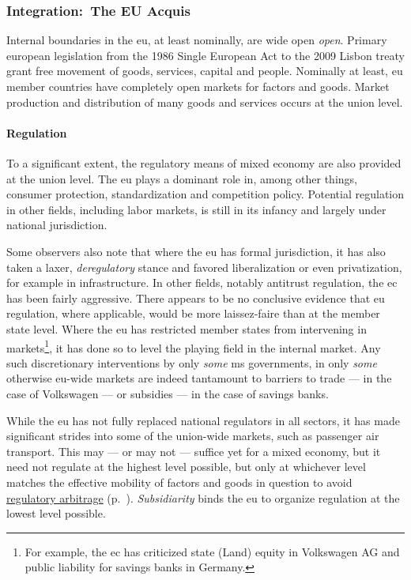 \subsubsection[Integration]{Integration:\ The EU Acquis}
	\label{sec:EU-Acquis}
Internal boundaries in the \gls{eu}, at least nominally, are wide open \emph{open}.
Primary european legislation from the 1986 Single European Act to the 2009 Lisbon treaty grant free movement of goods, services, capital and people.
Nominally at least, \gls{eu} member countries have completely open markets for factors and goods.
Market production and distribution of many goods and services occurs at the union level.

\paragraph{Regulation}
To a significant extent, the regulatory means of mixed economy are also provided at the union level.
The \gls{eu} plays a dominant role in, among other things, consumer protection, standardization and competition policy.
Potential regulation in other fields, including labor markets, is still in its infancy and largely under national jurisdiction.

Some observers also note that where the \gls{eu} has formal jurisdiction, it has also taken a laxer, \emph{deregulatory} stance and favored liberalization or even privatization, for example in infrastructure.
In other fields, notably antitrust regulation, the \gls{ec} has been fairly aggressive.
There appears to be no conclusive evidence that \gls{eu} regulation, where applicable, would be more laissez-faire than at the member state level.
Where the \gls{eu} has restricted member states from intervening in markets\footnote{
	For example, the \gls{ec} has criticized state (Land) equity in Volkswagen AG and public liability for savings banks in Germany.},
it has done so to level the playing field in the internal market.
Any such discretionary interventions by only \emph{some} \gls{ms} governments, in only \emph{some} otherwise \gls{eu}-wide markets are indeed tantamount to barriers to trade --- in the case of Volkswagen --- or subsidies --- in the case of savings banks.

While the \gls{eu} has not fully replaced national regulators in all sectors, it has made significant strides into some of the union-wide markets, such as passenger air transport.
This may --- or may not --- suffice yet for a mixed economy, but it need not regulate at the highest level possible, but only at whichever level matches the effective mobility of factors and goods in question to avoid \hyperref[sec:regulatory]{regulatory arbitrage} (p.~\pageref{sec:regulatory}).
\emph{Subsidiarity} binds the \gls{eu} to organize regulation at the lowest level possible.

